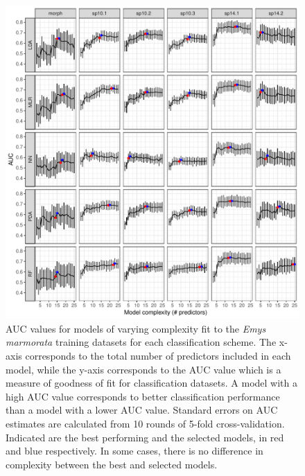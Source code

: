 \documentclass[11pt]{article}
\begin{document}
\begin{figure}[h!]
  \centering
  \includegraphics[height = 0.6\textheight, width = \textwidth, keepaspectratio = true]{figure/emys_model_sel}
  \caption{AUC values for models of varying complexity fit to the \textit{Emys marmorata} training datasets for each classification scheme. The x-axis corresponds to the total number of predictors included in each model, while the y-axis corresponds to the AUC value which is a measure of goodness of fit for classification datasets. A model with a high AUC value corresponds to better classification performance than a model with a lower AUC value. Standard errors on AUC estimates are calculated from 10 rounds of 5-fold cross-validation. Indicated are the best performing and the selected models, in red and blue respectively. In some cases, there is no difference in complexity between the best and selected models.}
  \label{fig:emys_sel}
\end{figure}
\end{document}
